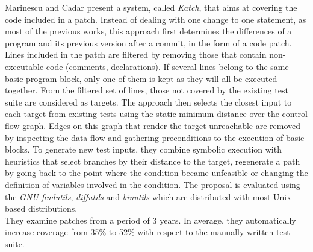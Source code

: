 Marinescu and Cadar \cite{marinescu2013katch} present a system, called \emph{Katch}, that aims at covering the code included in a patch. 
Instead of dealing with one change to one statement, as most of the previous works, this approach first determines the differences of a program and its previous version after a commit, in the form of a code patch. 
Lines included in the patch are filtered by removing those that contain non-executable code (\ie comments, declarations). 
If several lines belong to the same basic program block, only one of them is kept as they will all be executed together. 
From the filtered set of lines, those not covered by the existing test suite are considered as targets. 
The approach then selects the closest input to each target from existing tests using the static minimum distance over the control flow graph. 
Edges on this graph that render the target unreachable are removed by inspecting the data flow and gathering preconditions to the execution of basic blocks. 
To generate new test inputs, they combine symbolic execution with heuristics that select branches by their distance to the target, regenerate a path by going back to the point where the condition became unfeasible or changing the definition of variables involved in the condition. 
The proposal is evaluated using the \emph{GNU findutils}, \emph{diffutils} and \emph{binutils} which are distributed with most Unix-based distributions. \\
They examine patches from a period of 3 years. 
In average, they automatically increase coverage from 35\% to 52\% with respect to the manually written test suite.

